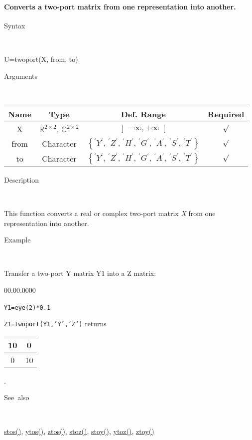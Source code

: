 \paragraph{\label{par:twoport}Converts a two-port matrix from one representation
into another.}

\begin{description}
\item [Syntax]~
\end{description}
U=twoport(X, from, to)

\begin{description}
\item [Arguments]~
\end{description}
\begin{tabular}{|c|c|c|c|}
\hline 
Name&
Type&
Def. Range&
Required\tabularnewline
\hline
\hline 
X&
$\mathbb{R}^{2\times2}$, $\mathbb{C}^{2\times2}$&
$\left]-\infty,+\infty\right[$&
$\surd$\tabularnewline
\hline
from&
Character&
$\left\{ ^{\prime}Y{}^{\prime},\,{}^{\prime}Z{}^{\prime},\,{}^{\prime}H{}^{\prime},\,{}^{\prime}G{}^{\prime},\,{}^{\prime}A{}^{\prime},\,{}^{\prime}S{}^{\prime},\,{}^{\prime}T{}^{\prime}\right\} $&
$\surd$\tabularnewline
\hline
to&
Character&
$\left\{ ^{\prime}Y{}^{\prime},\,{}^{\prime}Z{}^{\prime},\,{}^{\prime}H{}^{\prime},\,{}^{\prime}G{}^{\prime},\,{}^{\prime}A{}^{\prime},\,{}^{\prime}S{}^{\prime},\,{}^{\prime}T{}^{\prime}\right\} $&
$\surd$\tabularnewline
\hline
\end{tabular}

\begin{description}
\item [Description]~
\end{description}
This function converts a real or complex two-port matrix \textit{X}
from one representation into another. 

\begin{description}
\item [Example]~
\end{description}
Transfer a two-port Y matrix Y1 into a Z matrix:

\begin{lyxlist}{00.00.0000}
\item [\texttt{Y1=eye(2){*}0.1}]~
\item [\texttt{Z1=twoport(Y1,'Y','Z')}]returns \begin{tabular}{|c|c|}
\hline 
10&
0\tabularnewline
\hline
0&
10\tabularnewline
\hline
\end{tabular}.
\end{lyxlist}
\begin{description}
\item [See~also]~
\end{description}
\textcolor{blue}{\hyperlink{stos}{stos()}}\textcolor{black}{,} \textcolor{blue}{\hyperlink{ytos}{ytos()}}\textcolor{black}{,}
\textcolor{blue}{\hyperlink{ztos}{ztos()}}\textcolor{black}{,} \textcolor{blue}{\hyperlink{stoz}{stoz()}}\textcolor{black}{,}
\textcolor{blue}{\hyperlink{stoy}{stoy()}}\textcolor{black}{,} \textcolor{blue}{\hyperlink{ytoz}{ytoz()}}\textcolor{black}{,}
\textcolor{blue}{\hyperlink{ztoy}{ztoy()}}


